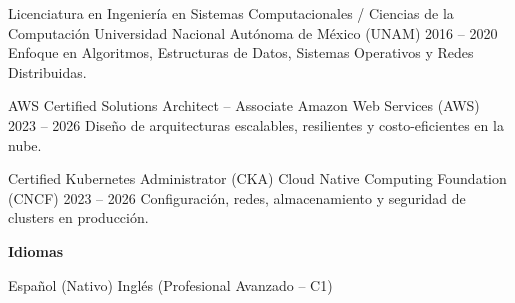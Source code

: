 %
%
%
%
%


\cvEducationItem
    {Licenciatura en Ingeniería en Sistemas Computacionales / Ciencias de la Computación}
    {Universidad Nacional Autónoma de México (UNAM)}
    {2016 -- 2020}
    {Enfoque en Algoritmos, Estructuras de Datos, Sistemas Operativos y Redes Distribuidas.}

\cvEducationItem
    {AWS Certified Solutions Architect -- Associate}
    {Amazon Web Services (AWS)}
    {2023 -- 2026}
    {Diseño de arquitecturas escalables, resilientes y costo-eficientes en la nube.}

\cvEducationItem
    {Certified Kubernetes Administrator (CKA)}
    {Cloud Native Computing Foundation (CNCF)}
    {2023 -- 2026}
    {Configuración, redes, almacenamiento y seguridad de clusters en producción.}

\vspace{1mm}
\noindent
\begin{minipage}[t]{\linewidth}
    \parbox[t]{0.25\linewidth}{%
        {\cvBodyStyle\textcolor{cvPrimary}{\textbf{Idiomas}}}%
    }%
    \hfill
    \parbox[t]{0.73\linewidth}{%
        {\cvBodyStyle\textcolor{cvSecondary}{Español (Nativo) \cvContactSep{} Inglés (Profesional Avanzado -- C1)}}%
    }\par
\end{minipage}

